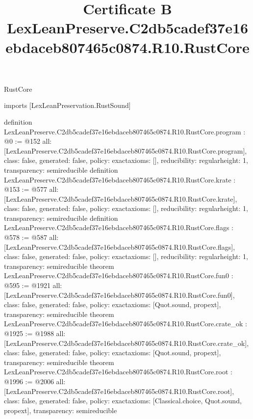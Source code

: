 \begin{lexlean}{RustCore}
\title{Certificate B LexLeanPreserve.C2db5cadef37e16ebdaceb807465c0874.R10.RustCore}
\begin{coremodule}
imports [LexLeanPreservation.RustSound]

definition LexLeanPreserve.C2db5cadef37e16ebdaceb807465c0874.R10.RustCore.program : @0 := @152 {
  all: [LexLeanPreserve.C2db5cadef37e16ebdaceb807465c0874.R10.RustCore.program],
  class: false,
  generated: false,
  policy: exact{axioms: []},
  reducibility: regular{height: 1},
  transparency: semireducible
}
definition LexLeanPreserve.C2db5cadef37e16ebdaceb807465c0874.R10.RustCore.krate : @153 := @577 {
  all: [LexLeanPreserve.C2db5cadef37e16ebdaceb807465c0874.R10.RustCore.krate],
  class: false,
  generated: false,
  policy: exact{axioms: []},
  reducibility: regular{height: 1},
  transparency: semireducible
}
definition LexLeanPreserve.C2db5cadef37e16ebdaceb807465c0874.R10.RustCore.flags : @578 := @587 {
  all: [LexLeanPreserve.C2db5cadef37e16ebdaceb807465c0874.R10.RustCore.flags],
  class: false,
  generated: false,
  policy: exact{axioms: []},
  reducibility: regular{height: 1},
  transparency: semireducible
}
theorem LexLeanPreserve.C2db5cadef37e16ebdaceb807465c0874.R10.RustCore.fun0 : @595 := @1921 {
  all: [LexLeanPreserve.C2db5cadef37e16ebdaceb807465c0874.R10.RustCore.fun0],
  class: false,
  generated: false,
  policy: exact{axioms: [Quot.sound, propext]},
  transparency: semireducible
}
theorem LexLeanPreserve.C2db5cadef37e16ebdaceb807465c0874.R10.RustCore.crate_ok : @1925 := @1988 {
  all: [LexLeanPreserve.C2db5cadef37e16ebdaceb807465c0874.R10.RustCore.crate_ok],
  class: false,
  generated: false,
  policy: exact{axioms: [Quot.sound, propext]},
  transparency: semireducible
}
theorem LexLeanPreserve.C2db5cadef37e16ebdaceb807465c0874.R10.RustCore.root : @1996 := @2006 {
  all: [LexLeanPreserve.C2db5cadef37e16ebdaceb807465c0874.R10.RustCore.root],
  class: false,
  generated: false,
  policy: exact{axioms: [Classical.choice, Quot.sound, propext]},
  transparency: semireducible
}


\end{coremodule}
\end{lexlean}
